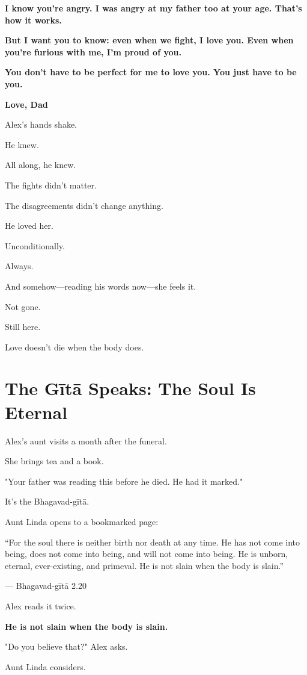 \documentclass[11pt,twoside]{book}
\begin{document}
\textbf{I know you're angry. I was angry at my father too at your age. That's how it works.}

\textbf{But I want you to know: even when we fight, I love you. Even when you're furious with me, I'm proud of you.}

\textbf{You don't have to be perfect for me to love you. You just have to be you.}

\textbf{Love, Dad}

Alex's hands shake.

He knew.

All along, he knew.

The fights didn't matter.

The disagreements didn't change anything.

He loved her.

Unconditionally.

Always.

And somehow—reading his words now—she feels it.

Not gone.

Still here.

Love doesn't die when the body does.

\section*{The Gītā Speaks: The Soul Is Eternal}

Alex's aunt visits a month after the funeral.

She brings tea and a book.

"Your father was reading this before he died. He had it marked."

It's the Bhagavad-gītā.

Aunt Linda opens to a bookmarked page:

\begin{pullquote}
``For the soul there is neither birth nor death at any time. He has not come into being, does not come into being, and will not come into being. He is unborn, eternal, ever-existing, and primeval. He is not slain when the body is slain.''

--- Bhagavad-gītā 2.20
\end{pullquote}

Alex reads it twice.

\textbf{He is not slain when the body is slain.}

"Do you believe that?" Alex asks.

Aunt Linda considers.
\end{document}
